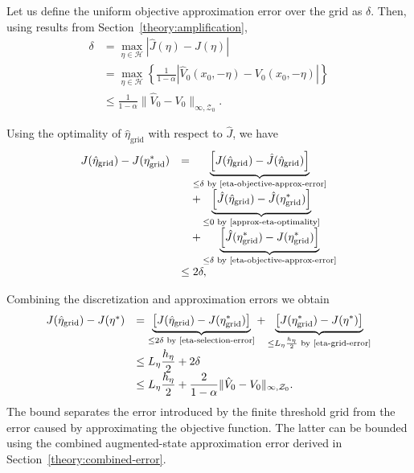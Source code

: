 Let us define the uniform objective approximation error over the grid as $\delta$. Then, using results from Section~\ref{theory:amplification},
\begin{equation}
	\begin{array}{rl}
		\delta & \displaystyle = \max_{\eta \in \mathcal{H}} |\hat{J}(\eta)-J(\eta)| \\
		& \displaystyle = \max_{\eta \in \mathcal{H}} \left\{ \frac{1}{1-\alpha} \left| \hat{V}_0(x_0, -\eta) - V_0(x_0, -\eta) \right| \right\} \\
		& \displaystyle \leq \frac{1}{1-\alpha} \| \hat{V}_0 - V_0 \|_{\infty, \mathcal{Z}_0}.
	\end{array}
	\label{eta-objective-approx-error}
\end{equation}

Using the optimality of $\hat\eta_{\text{grid}}$ with respect to $\hat J$, we have
\begin{equation}
	\begin{array}{rl}
		\displaystyle
		J(\hat\eta_{\text{grid}})
		-J(\eta_{\text{grid}}^*) & \displaystyle =
		\underbrace{\left[J(\hat\eta_{\text{grid}})
		-\hat J(\hat\eta_{\text{grid}})\right]}_{\leq \delta \text{ by \eqref{eta-objective-approx-error}}}\\[4pt]
		&\displaystyle\quad+
		\underbrace{\left[\hat J(\hat\eta_{\text{grid}})
		-\hat J(\eta_{\text{grid}}^*)\right]}_{\leq 0 \text{ by \eqref{approx-eta-optimality}}}\\[4pt]
		&\displaystyle\quad+
		\underbrace{\left[\hat J(\eta_{\text{grid}}^*)
		-J(\eta_{\text{grid}}^*)\right]}_{\leq \delta \text{ by \eqref{eta-objective-approx-error}}}\\[4pt]
		&\displaystyle\leq 2\delta,
	\end{array}
	\label{eta-selection-error}
\end{equation}

Combining the discretization and approximation errors we obtain
\begin{equation}
	\begin{array}{rl}
		J(\hat{\eta}_{\text{grid}}) - J(\eta^*) & \displaystyle = \underbrace{\left[ J(\hat{\eta}_{\text{grid}}) - J(\eta_{\text{grid}}^*) \right]}_{\leq 2\delta \text{ by \eqref{eta-selection-error}}} + \underbrace{\left[ J(\eta_{\text{grid}}^*) - J(\eta^*) \right]}_{\leq L_{\eta}\frac{h_{\eta}}{2} \text{ by \eqref{eta-grid-error}}} \\
		& \displaystyle \leq L_{\eta}\frac{h_{\eta}}{2} + 2\delta \\
		& \displaystyle \leq L_{\eta}\frac{h_{\eta}}{2} + \frac{2}{1-\alpha} \| \hat{V}_0 - V_0 \|_{\infty, \mathcal{Z}_0}.
	\end{array}
	\label{eta-combined-error}
\end{equation}
The bound separates the error introduced by the finite threshold grid from the error caused by approximating the objective function. The latter can be bounded using the combined augmented-state approximation error derived in Section~\ref{theory:combined-error}.




